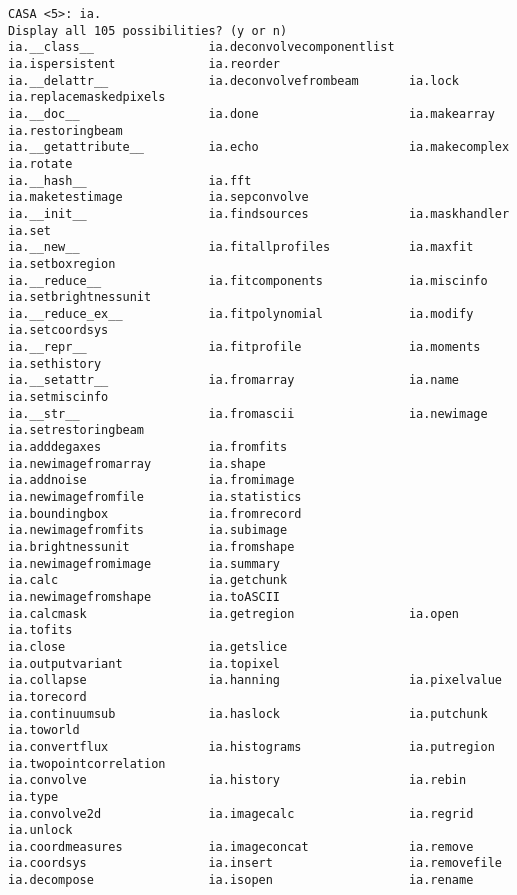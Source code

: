 \begin{verbatim}
CASA <5>: ia.
Display all 105 possibilities? (y or n)
ia.__class__                ia.deconvolvecomponentlist  ia.ispersistent             ia.reorder
ia.__delattr__              ia.deconvolvefrombeam       ia.lock                     ia.replacemaskedpixels
ia.__doc__                  ia.done                     ia.makearray                ia.restoringbeam
ia.__getattribute__         ia.echo                     ia.makecomplex              ia.rotate
ia.__hash__                 ia.fft                      ia.maketestimage            ia.sepconvolve
ia.__init__                 ia.findsources              ia.maskhandler              ia.set
ia.__new__                  ia.fitallprofiles           ia.maxfit                   ia.setboxregion
ia.__reduce__               ia.fitcomponents            ia.miscinfo                 ia.setbrightnessunit
ia.__reduce_ex__            ia.fitpolynomial            ia.modify                   ia.setcoordsys
ia.__repr__                 ia.fitprofile               ia.moments                  ia.sethistory
ia.__setattr__              ia.fromarray                ia.name                     ia.setmiscinfo
ia.__str__                  ia.fromascii                ia.newimage                 ia.setrestoringbeam
ia.adddegaxes               ia.fromfits                 ia.newimagefromarray        ia.shape
ia.addnoise                 ia.fromimage                ia.newimagefromfile         ia.statistics
ia.boundingbox              ia.fromrecord               ia.newimagefromfits         ia.subimage
ia.brightnessunit           ia.fromshape                ia.newimagefromimage        ia.summary
ia.calc                     ia.getchunk                 ia.newimagefromshape        ia.toASCII
ia.calcmask                 ia.getregion                ia.open                     ia.tofits
ia.close                    ia.getslice                 ia.outputvariant            ia.topixel
ia.collapse                 ia.hanning                  ia.pixelvalue               ia.torecord
ia.continuumsub             ia.haslock                  ia.putchunk                 ia.toworld
ia.convertflux              ia.histograms               ia.putregion                ia.twopointcorrelation
ia.convolve                 ia.history                  ia.rebin                    ia.type
ia.convolve2d               ia.imagecalc                ia.regrid                   ia.unlock
ia.coordmeasures            ia.imageconcat              ia.remove                   
ia.coordsys                 ia.insert                   ia.removefile               
ia.decompose                ia.isopen                   ia.rename              
\end{verbatim}
\normalsize

